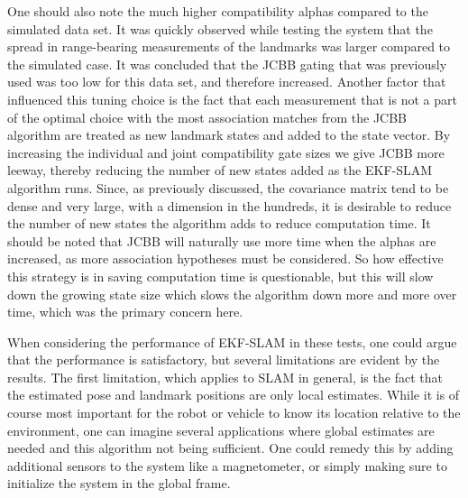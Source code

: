 One should also note the much higher compatibility alphas compared to the simulated data set. It was quickly observed while testing the system that the spread in range-bearing measurements of the landmarks was larger compared to the simulated case. It was concluded that the JCBB gating that was previously used was too low for this data set, and therefore increased. Another factor that influenced this tuning choice is the fact that each measurement that is not a part of the optimal choice with the most association matches from the JCBB algorithm are treated as new landmark states and added to the state vector. By increasing the individual and joint compatibility gate sizes we give JCBB more leeway, thereby reducing the number of new states added as the EKF-SLAM algorithm runs. Since, as previously discussed, the covariance matrix tend to be dense and very large, with a dimension in the hundreds, it is desirable to reduce the number of new states the algorithm adds to reduce computation time. It should be noted that JCBB will naturally use more time when the alphas are increased, as more association hypotheses must be considered. So how effective this strategy is in saving computation time is questionable, but this will slow down the growing state size which slows the algorithm down more and more over time, which was the primary concern here. 


When considering the performance of EKF-SLAM in these tests, one could argue that the performance is satisfactory, but several limitations are evident by the results. The first limitation, which applies to SLAM in general, is the fact that the estimated pose and landmark positions are only local estimates. While it is of course most important for the robot or vehicle to know its location relative to the environment, one can imagine several applications where global estimates are needed and this algorithm not being sufficient. One could remedy this by adding additional sensors to the system like a magnetometer, or simply making sure to initialize the system in the global frame. 

